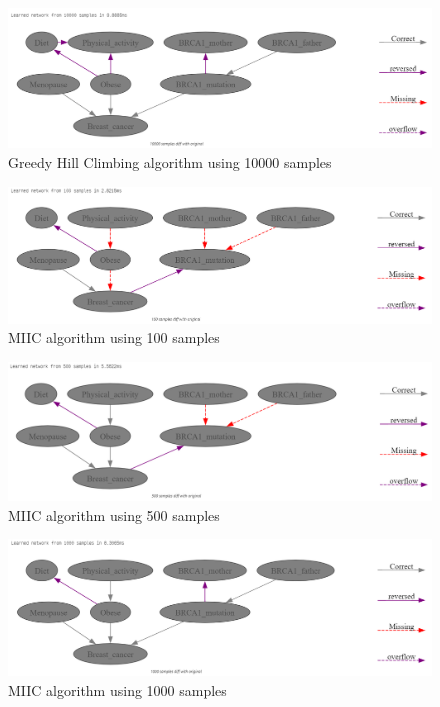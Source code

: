 \documentclass{article}
\begin{document}
\begin{figure}[H]
    \centering
    \includegraphics[width=\textwidth]{../figures/greedy_hill_10000.png}
    \caption{Greedy Hill Climbing algorithm using 10000 samples}
    \label{fig:ghc10000}
\end{figure}
\begin{figure}[H]
    \centering
    \includegraphics[width=\textwidth]{../figures/MIIC_100.png}
    \caption{MIIC algorithm using 100 samples}
    \label{fig:MIIC100}
\end{figure}
\begin{figure}[H]
    \centering
    \includegraphics[width=\textwidth]{../figures/MIIC_500.png}
    \caption{MIIC algorithm using 500 samples}
    \label{fig:MIIC500}
\end{figure}
\begin{figure}[H]
    \centering
    \includegraphics[width=\textwidth]{../figures/MIIC_1000.png}
    \caption{MIIC algorithm using 1000 samples}
    \label{fig:MIIC1000}
\end{figure}
\end{document}
